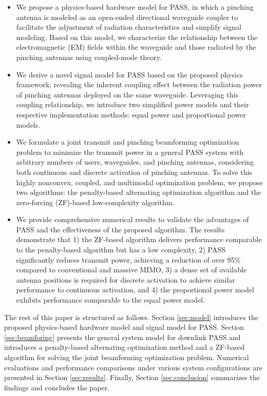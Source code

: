 \begin{itemize}
    \item We propose a physics-based hardware model for PASS, in which a pinching antenna is modeled as an open-ended directional waveguide coupler to facilitate the adjustment of radiation characteristics and simplify signal modeling. Based on this model, we characterize the relationship between the electromagnetic (EM) fields within the waveguide and those radiated by the pinching antennas using coupled-mode theory.
    \item We derive a novel signal model for PASS based on the proposed physics framework, revealing the inherent coupling effect between the radiation power of pinching antennas deployed on the same waveguide. Leveraging this coupling relationship, we introduce two simplified power models and their respective implementation methods: equal power and proportional power models.
    \item We formulate a joint transmit and pinching beamforming optimization problem to minimize the transmit power in a general PASS system with arbitrary numbers of users, waveguides, and pinching antennas, considering both continuous and discrete activation of pinching antennas. To solve this highly nonconvex, coupled, and multimodal optimization problem, we propose two algorithms: the penalty-based alternating optimization algorithm and the zero-forcing (ZF)-based low-complexity algorithm.
    \item We provide comprehensive numerical results to validate the advantages of PASS and the effectiveness of the proposed algorithm. The results demonstrate that 1) the ZF-based algorithm delivers performance comparable to the penalty-based algorithm but has a low complexity, 2) PASS significantly reduces transmit power, achieving a reduction of over 95\% compared to conventional and massive MIMO, 3) a dense set of available antenna positions is required for discrete activation to achieve similar performance to continuous activation, and 4) the proportional power model exhibits performance comparable to the equal power model.
\end{itemize}

The rest of this paper is structured as follows. Section \ref{sec:model} introduces the proposed physics-based hardware model and signal model for PASS. Section \ref{sec:beamforing} presents the general system model for downlink PASS and introduces a penalty-based alternating optimization method and a ZF-based algorithm for solving the joint beamforming optimization problem. Numerical evaluations and performance comparisons under various system configurations are presented in Section \ref{sec:results}. Finally, Section \ref{sec:conclusion} summarizes the findings and concludes the paper.



